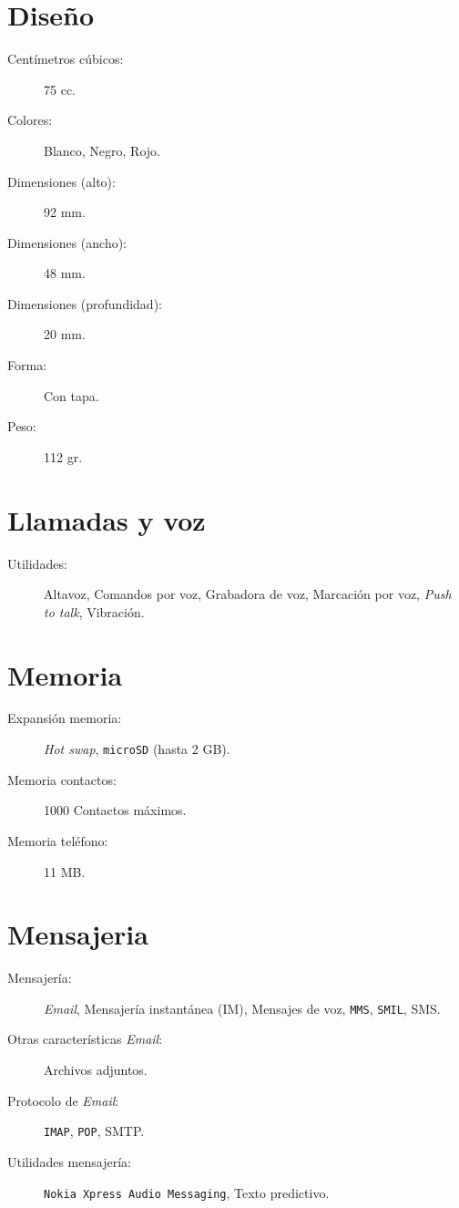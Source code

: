 \section{Diseño}
\begin{description}
\item[Centímetros cúbicos:] 75 cc.
\item[Colores:] Blanco, Negro, Rojo.
\item[Dimensiones (alto):] 92 mm.
\item[Dimensiones (ancho):]	48 mm.
\item[Dimensiones (profundidad):] 20 mm.
\item[Forma:] Con tapa.
\item[Peso:] 112 gr.
\end{description}
\section{Llamadas y voz}
\begin{description}
\item[Utilidades:] Altavoz, Comandos por voz, Grabadora de voz, Marcación por 
voz, \emph{Push to talk}, Vibración.
\end{description}
\section{Memoria}
\begin{description}
\item[Expansión memoria:] \emph{Hot swap}, \texttt{microSD} (hasta 2 GB).
\item[Memoria contactos:] 1000 Contactos máximos.
\item[Memoria teléfono:] 11 MB.
\end{description}
\section{Mensajeria}
\begin{description}
\item[Mensajería:] \emph{Email}, Mensajería instantánea (IM), Mensajes de voz, 
\texttt{MMS}, \texttt{SMIL}, \acs{SMS}.
\item[Otras características \emph{Email}:] Archivos adjuntos.
\item[Protocolo de \emph{Email}:] \texttt{IMAP}, \texttt{POP}, \acs{SMTP}.
\item[Utilidades mensajería:] \texttt{Nokia Xpress Audio Messaging}, Texto 
predictivo.
\end{description}
